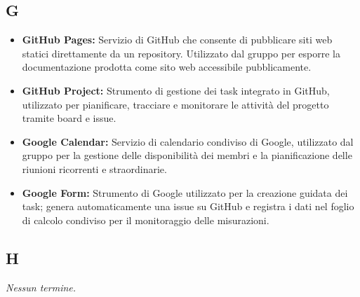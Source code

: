 \subsection*{G}
\begin{itemize}[leftmargin=*]
    \item \textbf{GitHub Pages:} Servizio di GitHub che consente di pubblicare siti
          web statici direttamente da un repository. Utilizzato dal gruppo per
          esporre la documentazione prodotta come sito web accessibile pubblicamente.
    \item \textbf{GitHub Project:} Strumento di gestione dei task integrato in
          GitHub, utilizzato per pianificare, tracciare e monitorare le attività
          del progetto tramite board e issue.
    \item \textbf{Google Calendar:} Servizio di calendario condiviso di Google,
          utilizzato dal gruppo per la gestione delle disponibilità dei membri e
          la pianificazione delle riunioni ricorrenti e straordinarie.
    \item \textbf{Google Form:} Strumento di Google utilizzato per la creazione
          guidata dei task; genera automaticamente una issue su GitHub e registra
          i dati nel foglio di calcolo condiviso per il monitoraggio delle
          misurazioni.
\end{itemize}
 
{}
\subsection*{H}
\textit{Nessun termine.}
 
{}
